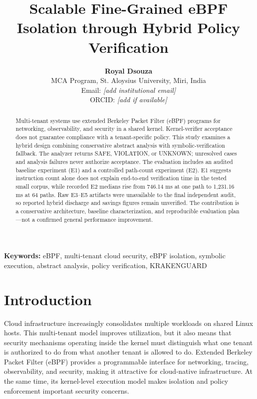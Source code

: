 \documentclass[12pt,a4paper]{article}
\begin{document}
\title{Scalable Fine-Grained eBPF Isolation through Hybrid Policy Verification}

\author{
\textbf{Royal Dsouza}\\
MCA Program, St. Aloysius University, Miri, India\\
Email: \textit{[add institutional email]}\\
ORCID: \textit{[add if available]}
}

\maketitle

\begin{abstract}
Multi-tenant systems use extended Berkeley Packet Filter (eBPF) programs for networking, observability, and security in a shared kernel. Kernel-verifier acceptance does not guarantee compliance with a tenant-specific policy. This study examines a hybrid design combining conservative abstract analysis with symbolic-verification fallback. The analyzer returns SAFE, VIOLATION, or UNKNOWN; unresolved cases and analysis failures never authorize acceptance. The evaluation includes an audited baseline experiment (E1) and a controlled path-count experiment (E2). E1 suggests instruction count alone does not explain end-to-end verification time in the tested small corpus, while recorded E2 medians rise from 746.14 ms at one path to 1,231.16 ms at 64 paths. Raw E3--E5 artifacts were unavailable to the final independent audit, so reported hybrid discharge and savings figures remain unverified. The contribution is a conservative architecture, baseline characterization, and reproducible evaluation plan—not a confirmed general performance improvement.
\end{abstract}

\noindent\textbf{Keywords:} eBPF, multi-tenant cloud security, eBPF isolation, symbolic execution, abstract analysis, policy verification, KRAKENGUARD


\section{Introduction}

Cloud infrastructure increasingly consolidates multiple workloads on shared Linux hosts. This multi-tenant model improves utilization, but it also means that security mechanisms operating inside the kernel must distinguish what one tenant is authorized to do from what another tenant is allowed to do. Extended Berkeley Packet Filter (eBPF) provides a programmable interface for networking, tracing, observability, and security, making it attractive for cloud-native infrastructure. At the same time, its kernel-level execution model makes isolation and policy enforcement important security concerns.
\end{document}
